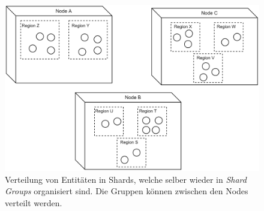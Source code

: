 \begin{figure}
    \centering
    \includegraphics[width=0.8\linewidth]{gfx/implementation/Sharding}
    \caption{Verteilung von Entitäten in Shards, welche selber wieder in \textit{Shard Groups} organisiert sind. Die Gruppen können zwischen den Nodes verteilt werden. }
    \label{fig:implementation:actorSharding}
\end{figure} 


